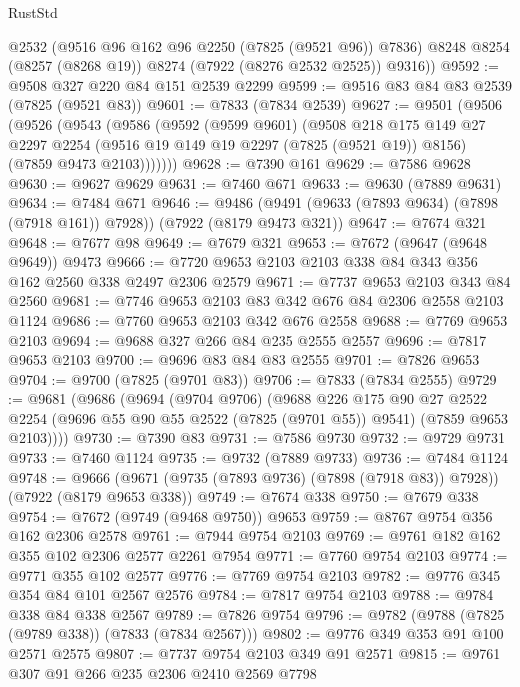 \begin{lexlean}{RustStd}
\begin{coremodule}
        @2532
        (@9516 @96 @162 @96 @2250 (@7825 (@9521 @96)) @7836)
        @8248
        @8254
        (@8257 (@8268 @19))
        @8274
        (@7922 (@8276 @2532 @2525))
        @9316))
@9592 := @9508 @327 @220 @84 @151 @2539 @2299
@9599 := @9516 @83 @84 @83 @2539 (@7825 (@9521 @83))
@9601 := @7833 (@7834 @2539)
@9627 := @9501
    (@9506
      (@9526
        (@9543
          (@9586
            (@9592
              (@9599 @9601)
              (@9508
                @218
                @175
                @149
                @27
                @2297
                @2254
                (@9516 @19 @149 @19 @2297 (@7825 (@9521 @19)) @8156)
                (@7859 @9473 @2103)))))))
@9628 := @7390 @161
@9629 := @7586 @9628
@9630 := @9627 @9629
@9631 := @7460 @671
@9633 := @9630 (@7889 @9631)
@9634 := @7484 @671
@9646 := @9486 (@9491 (@9633 (@7893 @9634) (@7898 (@7918 @161)) @7928)) (@7922 (@8179 @9473 @321))
@9647 := @7674 @321
@9648 := @7677 @98
@9649 := @7679 @321
@9653 := @7672 (@9647 (@9648 @9649)) @9473
@9666 := @7720 @9653 @2103 @2103 @338 @84 @343 @356 @162 @2560 @338 @2497 @2306 @2579
@9671 := @7737 @9653 @2103 @343 @84 @2560
@9681 := @7746 @9653 @2103 @83 @342 @676 @84 @2306 @2558 @2103 @1124
@9686 := @7760 @9653 @2103 @342 @676 @2558
@9688 := @7769 @9653 @2103
@9694 := @9688 @327 @266 @84 @235 @2555 @2557
@9696 := @7817 @9653 @2103
@9700 := @9696 @83 @84 @83 @2555
@9701 := @7826 @9653
@9704 := @9700 (@7825 (@9701 @83))
@9706 := @7833 (@7834 @2555)
@9729 := @9681
    (@9686
      (@9694
        (@9704 @9706)
        (@9688
          @226
          @175
          @90
          @27
          @2522
          @2254
          (@9696 @55 @90 @55 @2522 (@7825 (@9701 @55)) @9541)
          (@7859 @9653 @2103))))
@9730 := @7390 @83
@9731 := @7586 @9730
@9732 := @9729 @9731
@9733 := @7460 @1124
@9735 := @9732 (@7889 @9733)
@9736 := @7484 @1124
@9748 := @9666 (@9671 (@9735 (@7893 @9736) (@7898 (@7918 @83)) @7928)) (@7922 (@8179 @9653 @338))
@9749 := @7674 @338
@9750 := @7679 @338
@9754 := @7672 (@9749 (@9468 @9750)) @9653
@9759 := @8767 @9754 @356 @162 @2306 @2578
@9761 := @7944 @9754 @2103
@9769 := @9761 @182 @162 @355 @102 @2306 @2577 @2261 @7954
@9771 := @7760 @9754 @2103
@9774 := @9771 @355 @102 @2577
@9776 := @7769 @9754 @2103
@9782 := @9776 @345 @354 @84 @101 @2567 @2576
@9784 := @7817 @9754 @2103
@9788 := @9784 @338 @84 @338 @2567
@9789 := @7826 @9754
@9796 := @9782 (@9788 (@7825 (@9789 @338)) (@7833 (@7834 @2567)))
@9802 := @9776 @349 @353 @91 @100 @2571 @2575
@9807 := @7737 @9754 @2103 @349 @91 @2571
@9815 := @9761 @307 @91 @266 @235 @2306 @2410 @2569 @7798

\end{coremodule}
\end{lexlean}
